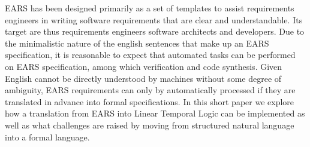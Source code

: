 EARS\cite{EARS09}\cite{earsctrlProcess}\cite{LucioRCA16}\cite{LucioRAM17} has
been designed primarily as a set of templates to assist requirements engineers in writing software requirements that are clear and understandable.
Its target are thus requirements engineers software architects and developers.
Due to the minimalistic nature of the english sentences that make up an EARS
specification, it is reasonable to expect that automated tasks can be performed
on EARS specification, among which verification and code synthesis. Given
English cannot be directly understood by machines without some degree of
ambiguity, EARS requirements can only by automatically processed if they are
translated in advance into formal specifications. In this short paper we explore
how a translation from EARS into Linear Temporal Logic can be implemented as
well as what challenges are raised by moving from structured natural language
into a formal language.